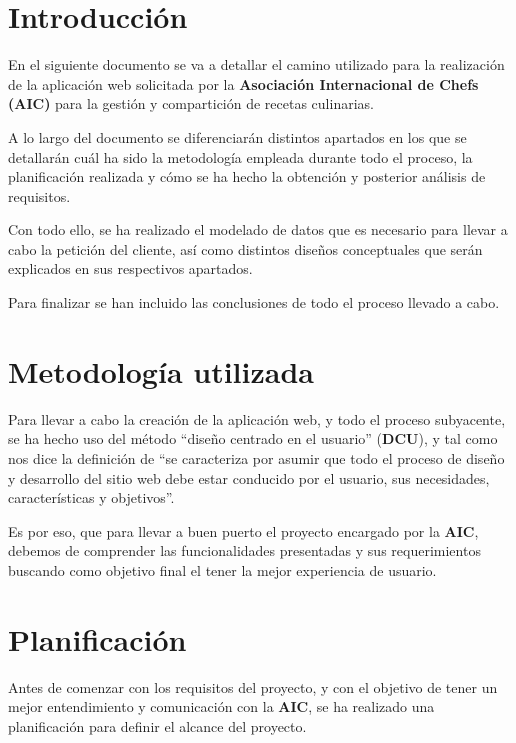 \documentclass{\ClassPath/viu-tfm-template}
\begin{document}
    \graphicspath{{../../VIU_TFM_LaTeX_template/}}

    \coverpage

    \tableofcontents

\chapter{Introducción}
En el siguiente documento se va a detallar el camino utilizado para la realización de la aplicación web solicitada por la  \textbf{Asociación Internacional de Chefs (AIC)} para la gestión y compartición de recetas culinarias.

A lo largo del documento se diferenciarán distintos apartados en los que se detallarán cuál ha sido la metodología empleada durante todo el proceso, la planificación realizada y cómo se ha hecho la obtención y posterior análisis de requisitos.

Con todo ello, se ha realizado el modelado de datos que es necesario para llevar a cabo la petición del cliente, así como distintos diseños conceptuales que serán explicados en sus respectivos apartados.

Para finalizar se han incluido las conclusiones de todo el proceso llevado a cabo.


\chapter{Metodología utilizada}
Para llevar a cabo la creación de la aplicación web, y todo el proceso subyacente, se ha hecho uso del método “diseño centrado en el usuario” (\textbf{DCU}), y tal como nos dice la definición de \textcite{hassan2004diseno} “se caracteriza por asumir que todo el proceso de diseño y desarrollo del sitio web debe estar conducido por el usuario, sus necesidades, características y objetivos”.

Es por eso, que para llevar a buen puerto el proyecto encargado por la \textbf{AIC}, debemos de comprender las funcionalidades presentadas y sus requerimientos buscando como objetivo final el tener la mejor experiencia de usuario.

\chapter{Planificación}
Antes de comenzar con los requisitos del proyecto, y con el objetivo de tener un mejor entendimiento y comunicación con la \textbf{AIC}, se ha realizado una planificación para definir el alcance del proyecto.
\end{document}
